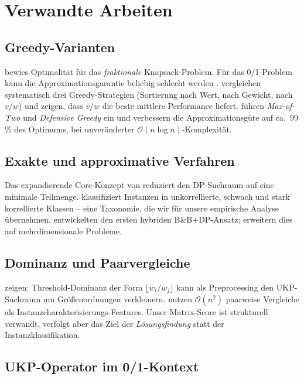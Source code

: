 \documentclass[a4paper,11pt]{article}
\begin{document}
\section{Verwandte Arbeiten}

\subsection{Greedy-Varianten}

\citet{dantzig1957} bewies Optimalität für das \emph{fraktionale}
Knapsack-Problem. Für das 0/1-Problem kann die Approximationsgarantie
beliebig schlecht werden \citep{kellerer2004}.
\citet{hristakeva2005} vergleichen systematisch drei Greedy-Strategien
(Sortierung nach Wert, nach Gewicht, nach $v/w$) und zeigen, dass
$v/w$ die beste mittlere Performance liefert.
\citet{hristakeva2023} führen \emph{Max-of-Two} und
\emph{Defensive Greedy} ein und verbessern die Approximationsgüte
auf ca.\ 99\,\% des Optimums, bei unveränderter
$\mathcal{O}(n\log n)$-Komplexität.

\subsection{Exakte und approximative Verfahren}

Das expandierende Core-Konzept von \citet{pisinger1995,pisinger1997}
reduziert den DP-Suchraum auf eine minimale Teilmenge.
\citet{pisinger2005} klassifiziert Instanzen in unkorrellierte,
schwach und stark korrellierte Klassen -- eine Taxonomie, die wir
für unsere empirische Analyse übernehmen.
\citet{plateau1982} entwickelten den ersten hybriden B\&B+DP-Ansatz;
\citet{balev2008} erweitern dies auf mehrdimensionale Probleme.

\subsection{Dominanz und Paarvergleiche}

\citet{andonov2000} zeigen: Threshold-Dominanz der Form
$\lfloor w_i/w_j \rfloor$ kann als Preprocessing den UKP-Suchraum
um Größenordnungen verkleinern. \citet{smithmiles2021} nutzen
$\mathcal{O}(n^2)$ paarweise Vergleiche als
Instanzcharakterisierungs-Features.
Unser Matrix-Score ist strukturell verwandt, verfolgt aber das
Ziel der \emph{Lösungsfindung} statt der Instanzklassifikation.

\subsection{UKP-Operator im 0/1-Kontext}
\label{sec:ukp}
\end{document}
